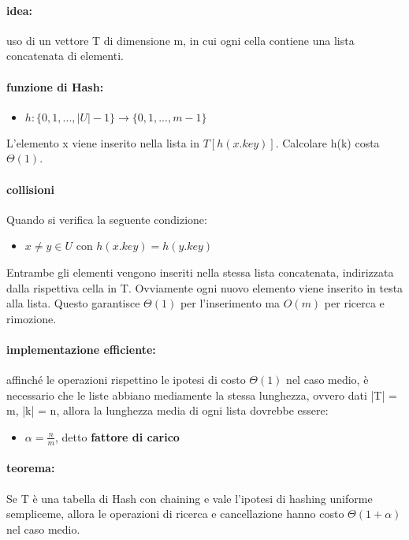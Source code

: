 \documentclass{article}
\begin{document}
\paragraph{idea:} uso di un vettore T di dimensione m, in cui ogni cella contiene una lista concatenata di elementi.
\paragraph{funzione di Hash:}
\begin{itemize}
    \item  $h: \{ 0,1,...,|U|-1 \} \rightarrow \{0,1,...,m-1\}$
\end{itemize}
L'elemento x viene inserito nella lista in $T[h(x.key)]$. Calcolare h(k) costa $\Theta(1)$.
\paragraph{collisioni} Quando si verifica la seguente condizione:
\begin{itemize}
    \item $x \neq y \in U$ con $h(x.key) = h(y.key)$
\end{itemize}
Entrambe gli elementi vengono inseriti nella stessa lista concatenata, indirizzata dalla rispettiva cella in T. Ovviamente ogni 
nuovo elemento viene inserito in testa alla lista. Questo garantisce $\Theta(1)$ per l'inserimento ma $O(m)$ per ricerca e rimozione.

\paragraph{implementazione efficiente:} affinché le operazioni rispettino le ipotesi di costo $\Theta(1)$ nel caso medio, è necessario che le liste abbiano 
mediamente la stessa lunghezza, ovvero dati |T| = m, |k| = n, allora la lunghezza media di ogni lista dovrebbe essere:
\begin{itemize}
\item $\displaystyle \alpha = \frac{n}{m}$, detto \textbf{fattore di carico}
\end{itemize}

\paragraph{teorema:} Se T è una tabella di Hash con chaining e vale l'ipotesi di hashing uniforme sempliceme, allora le operazioni di ricerca e cancellazione 
hanno costo $\Theta(1 + \alpha)$ nel caso medio.
\end{document}
